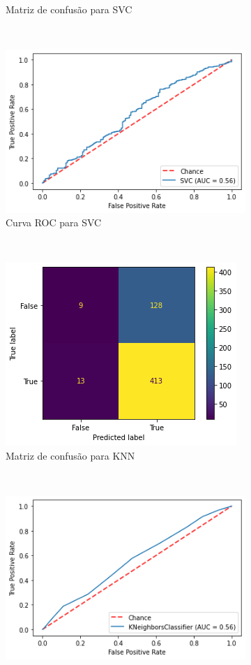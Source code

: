 \begin{figure}[htb]
\begin{subfigure}[b]{0.45\textwidth}
        \caption{Matriz de confusão para SVC}
        \label{fig:resultados:base-de-dados-28.3.3-confusion-matrix-svc-monthly-cnae}
    \end{subfigure} ~ \quad
    \begin{subfigure}[b]{0.45\textwidth}
        \includegraphics[scale=0.45]{images/base-de-dados-28.3.4-roc-curve-svc-monthly-cnae.png}
        \caption{Curva ROC para SVC}
        \label{fig:resultados:base-de-dados-28.3.4-roc-curve-svc-monthly-cnae}
    \end{subfigure} ~ \\
    \centering
    \begin{subfigure}[b]{0.45\textwidth}
        \includegraphics[scale=0.45]{images/base-de-dados-28.3.5-confusion-matrix-knn-monthly-cnae.png}
        \caption{Matriz de confusão para KNN}
        \label{fig:resultados:base-de-dados-28.3.5-confusion-matrix-knn-monthly-cnae}
    \end{subfigure} ~ \quad
    \begin{subfigure}[b]{0.45\textwidth}
        \includegraphics[scale=0.45]{images/base-de-dados-28.3.6-roc-curve-knn-monthly-cnae.png}

\end{subfigure}
\end{figure}
